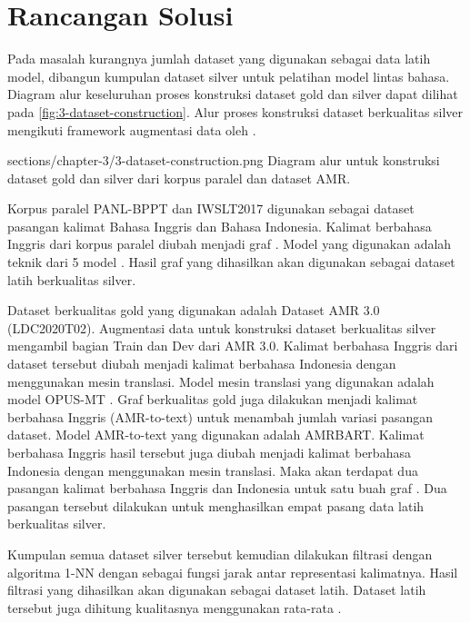 \section{Rancangan Solusi}

Pada masalah kurangnya jumlah dataset yang digunakan sebagai data latih model, dibangun kumpulan dataset silver untuk pelatihan model \amrparsing{} lintas bahasa.
Diagram alur keseluruhan proses konstruksi dataset gold dan silver dapat dilihat pada \cref{fig:3-dataset-construction}.
Alur proses konstruksi dataset berkualitas silver mengikuti framework augmentasi data oleh \textcite{lee2022}.

  {sections/chapter-3/3-dataset-construction.png}
  {Diagram alur untuk konstruksi dataset gold dan silver dari korpus paralel dan dataset AMR.}

Korpus paralel PANL-BPPT dan IWSLT2017 digunakan sebagai dataset pasangan kalimat Bahasa Inggris dan Bahasa Indonesia.
Kalimat berbahasa Inggris dari korpus paralel diubah menjadi graf \AMR{}.
Model \amrparsing{} yang digunakan adalah teknik  dari 5 model \sota{} .
Hasil graf \AMR{} yang dihasilkan akan digunakan sebagai dataset latih berkualitas silver.

Dataset \AMR{} berkualitas gold yang digunakan adalah Dataset AMR 3.0 (LDC2020T02).
Augmentasi data untuk konstruksi dataset berkualitas silver mengambil bagian Train dan Dev  dari AMR 3.0.
Kalimat berbahasa Inggris dari dataset \AMR{} tersebut diubah menjadi kalimat berbahasa Indonesia dengan menggunakan mesin translasi.
Model mesin translasi yang digunakan adalah model {OPUS-MT} .
Graf \AMR{} berkualitas gold juga dilakukan  menjadi kalimat berbahasa Inggris (AMR-to-text) untuk menambah jumlah variasi pasangan dataset.
Model AMR-to-text yang digunakan adalah \gls{AMRBART}.
Kalimat berbahasa Inggris hasil  tersebut juga diubah menjadi kalimat berbahasa Indonesia dengan menggunakan mesin translasi.
Maka akan terdapat dua pasangan kalimat berbahasa Inggris dan Indonesia untuk satu buah graf \AMR{}.
Dua pasangan tersebut dilakukan  untuk menghasilkan empat pasang data latih berkualitas silver.

Kumpulan semua dataset silver tersebut kemudian dilakukan filtrasi dengan algoritma 1-NN dengan \cossim{} sebagai fungsi jarak antar representasi kalimatnya.
Hasil filtrasi yang dihasilkan akan digunakan sebagai dataset latih.
Dataset latih tersebut juga dihitung kualitasnya menggunakan rata-rata \cossim{}.

